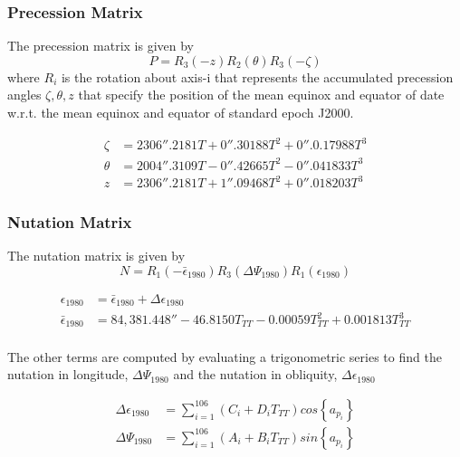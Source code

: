 \documentclass[12pt,letterpaper]{paper}
\begin{document}
\subsubsection{Precession Matrix}
The precession matrix is given by
\begin{equation}
P = R_3(-z)R_2(\theta)R_3(-\zeta)
\end{equation}
where $R_i$ is the rotation about axis-i that represents the accumulated precession angles $\zeta, \theta, z$ that specify the position of the mean equinox and equator of date w.r.t. the mean equinox and equator of standard epoch J2000.

\begin{align}
\zeta &= 2306''.2181T + 0''.30188T^2 + 0''.0.17988T^3\\
\theta &= 2004''.3109T - 0''.42665T^2 - 0''.041833T^3\\
z &= 2306''.2181T + 1''.09468T^2 + 0''.018203T^3
\end{align}

\subsubsection{Nutation Matrix}
The nutation matrix is given by
\begin{equation}
N = R_1(- \bar{\epsilon}_{1980})R_3(\Delta\Psi_{1980})R_1(\epsilon_{1980})
\end{equation}

\begin{align}
\epsilon_{1980} &= \bar{\epsilon}_{1980} + \Delta \epsilon_{1980} \\
\bar{\epsilon}_{1980} &= 84,381.448'' - 46.8150T_{TT} - 0.00059T^2_{TT} + 0.001813 T^3_{TT}\\
\end{align}


The other terms are computed by evaluating a trigonometric series to find the nutation in longitude, $\Delta\Psi_{1980}$ and the nutation in obliquity,  $\Delta \epsilon_{1980}$

\begin{align}
\Delta \epsilon_{1980} &= \sum_{i=1}^{106} (C_i + D_i T_{TT})cos\left\lbrace{a_{p_i}}\right\rbrace \\
\Delta \Psi_{1980} &= \sum_{i=1}^{106} (A_i + B_i T_{TT})sin\left\lbrace{a_{p_i}}\right\rbrace
\end{align}
\end{document}
